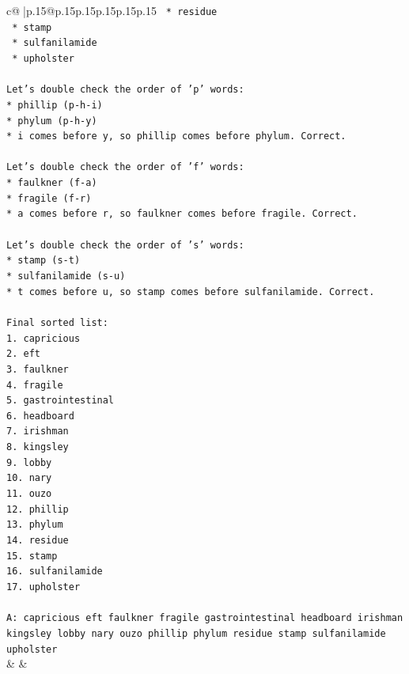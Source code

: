 \documentclass{article}
\begin{document}
{\begin{supertabular}{c@{$\;$}|p{.15\linewidth}@{}p{.15\linewidth}p{.15\linewidth}p{.15\linewidth}p{.15\linewidth}p{.15\linewidth}}
{{{\texttt{        *   residue} \\
\texttt{        *   stamp} \\
\texttt{        *   sulfanilamide} \\
\texttt{        *   upholster} \\
\\ 
\texttt{Let's double check the order of 'p' words:} \\
\texttt{*   phillip (p{-}h{-}i)} \\
\texttt{*   phylum (p{-}h{-}y)} \\
\texttt{*   i comes before y, so phillip comes before phylum. Correct.} \\
\\ 
\texttt{Let's double check the order of 'f' words:} \\
\texttt{*   faulkner (f{-}a)} \\
\texttt{*   fragile (f{-}r)} \\
\texttt{*   a comes before r, so faulkner comes before fragile. Correct.} \\
\\ 
\texttt{Let's double check the order of 's' words:} \\
\texttt{*   stamp (s{-}t)} \\
\texttt{*   sulfanilamide (s{-}u)} \\
\texttt{*   t comes before u, so stamp comes before sulfanilamide. Correct.} \\
\\ 
\texttt{Final sorted list:} \\
\texttt{1. capricious} \\
\texttt{2. eft} \\
\texttt{3. faulkner} \\
\texttt{4. fragile} \\
\texttt{5. gastrointestinal} \\
\texttt{6. headboard} \\
\texttt{7. irishman} \\
\texttt{8. kingsley} \\
\texttt{9. lobby} \\
\texttt{10. nary} \\
\texttt{11. ouzo} \\
\texttt{12. phillip} \\
\texttt{13. phylum} \\
\texttt{14. residue} \\
\texttt{15. stamp} \\
\texttt{16. sulfanilamide} \\
\texttt{17. upholster} \\
\\ 
\texttt{A: capricious eft faulkner fragile gastrointestinal headboard irishman kingsley lobby nary ouzo phillip phylum residue stamp sulfanilamide upholster} \\
            }
        }
    }
    & & \\ \\


\end{supertabular}}
\end{document}
